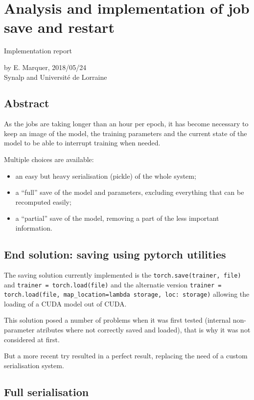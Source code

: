 \section{Analysis and implementation of job save and
restart}

Implementation report

by E. Marquer, 2018/05/24\\
Synalp and Université de Lorraine

\subsection{Abstract}

As the jobs are taking longer than an hour per epoch, it has become
necessary to keep an image of the model, the training parameters and the
current state of the model to be able to interrupt training when needed.

Multiple choices are available:
\begin{itemize}
\item an easy but heavy serialisation (pickle) of the whole system;
\item a ``full'' save of the model and parameters, excluding everything that can be recomputed easily;
\item a ``partial'' save of the model, removing a part of the less important
information.
\end{itemize}

\subsection{\texorpdfstring{\textbf{End solution: saving using pytorch
utilities}}{End solution: saving using pytorch utilities}}

The saving solution currently implemented is the
\lstinline!torch.save(trainer, file)! and
\lstinline!trainer = torch.load(file)! and the alternatie version
\lstinline!trainer = torch.load(file, map_location=lambda storage, loc: storage)!
allowing the loading of a CUDA model out of CUDA.

This solution posed a number of problems when it was first tested
(internal non-parameter atributes where not correctly saved and loaded),
that is why it was not considered at first.

But a more recent try resulted in a perfect result, replacing the need
of a custom serialisation system.

\subsection{Full serialisation}


